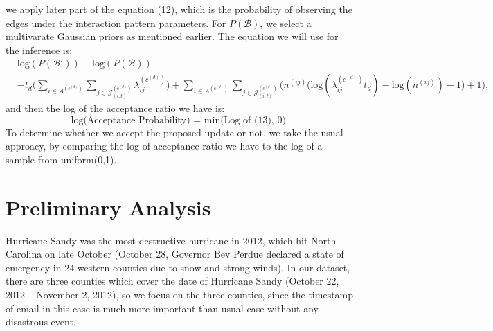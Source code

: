\documentclass[a4paper]{article}
\begin{document}
we apply later part of the equation (12), which is the probability of observing the edges under the interaction pattern parameters. For $P(\mathcal{B})$, we select a multivarate Gaussian priors as mentioned earlier. The equation we will use for the inference is:
	\begin{equation}
	\begin{aligned} 
	&\mbox{log}(P(\mathcal{B'}))-\mbox{log}(P(\mathcal{B}))\\&-t_d\big(\sum\limits_{i \in A^{(c^{(d)})}}\sum\limits_{j\in \mathcal{J}^{(c^{(d)})}_{(i, t)}}\lambda_{ij}^{(c^{(d)})}\big)+\sum_{i \in A^{(c^{(d)})}}\sum_{j\in \mathcal{J}^{(c^{(d)})}_{(i, t)}}\Big(n^{(ij)}\big(\mbox{log}(\lambda_{ij}^{(c^{(d)})}t_d)-\mbox{log}(n^{(ij)})-1\big)+1\Big), 
	\end{aligned}
	\end{equation}
	and then the log of the acceptance ratio we have is:
		\begin{equation}
		\mbox{log(Acceptance Probability) = min(Log of (13), 0) }
			\end{equation}
To determine whether we accept the proposed update or not, we take the usual approacy, by comparing the log of acceptance ratio we have to the log of a sample from uniform(0,1).
\section{Preliminary Analysis}
Hurricane Sandy was the most destructive hurricane in 2012, which hit North Carolina on late October (October 28, Governor Bev Perdue declared a state of emergency in 24 western counties due to snow and strong winds). In our dataset, there are three counties which cover the date of Hurricane Sandy (October 22, 2012 – November 2, 2012), so we focus on the three counties, since the timestamp of email in this case is much more important than usual case without any disastrous event.
\end{document}
